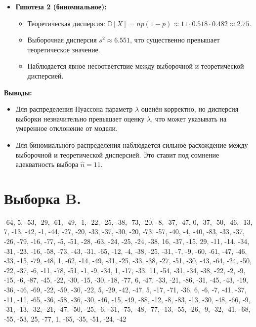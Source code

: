 \documentclass[12pt]{article}
\begin{document}
\begin{enumerate}
\begin{itemize}
        \item \textbf{Гипотеза 2 (биномиальное):}  
            \begin{itemize}  
                \item Теоретическая дисперсия: \( \mathbb{D}[X] = np(1-p) \approx 11 \cdot 0.518 \cdot 0.482 \approx 2.75 \).  
                \item Выборочная дисперсия \( s^2 \approx 6.551 \), что существенно превышает теоретическое значение.  
                \item Наблюдается явное несоответствие между выборочной и теоретической дисперсией.  
            \end{itemize}  
    \end{itemize}  
\end{enumerate}

\textbf{Выводы:}
\begin{itemize}
\item Для распределения Пуассона параметр $\lambda$ оценён корректно, но дисперсия выборки незначительно превышает оценку $\lambda$, что может указывать на умеренное отклонение от модели.
\item Для биномиального распределения наблюдается сильное расхождение между выборочной и теоретической дисперсией. Это ставит под сомнение адекватность выбора $\hat{n} = 11$.
\end{itemize}

\newpage

\section*{Выборка B.}
-64, 5, -53, -29, -61, -49, -1, -22, -25, -38, -73, -20, -8, -37, -47,
    0, -37, -50, -46, -13, 7, -13, -42, -1, -44, -27, -20, -33, -37, -30,
    -20, -73, -57, -40, -4, -40, -83, -33, -37, -26, -79, -16, -77, -5, -51,
    -28, -63, -24, -25, -24, -38, 16, -37, -15, 29, -11, -14, -34, -31, -23,
    -16, -58, -73, -43, -31, -65, -12, -4, -38, -25, -31, -7, -9, -60, -61,
    -47, -46, -33, -15, -79, -48, 1, -62, -14, -49, -31, -25, -33, -38, -27,
    -51, -30, -43, -64, -24, -50, -22, -37, -6, -11, -78, -51, -1, -9, -34,
    1, -17, -33, 11, -54, -31, -34, -38, -22, -2, -9, -15, -6, -87, -45,
    -22, -30, -15, -30, -18, -77, 6, -47, -33, -21, -86, -31, -45, -43, -19,
    -36, -46, -69, -22, -59, -30, -22, 5, -29, -42, -47, 5, -17, -71, -36,
    6, -6, -7, -41, -37, -11, -11, -65, -36, -58, -36, -30, -46, -15, -49,
    -88, -12, -8, -83, -13, -30, -48, -66, -9, -31, -13, -32, -21, -47, -50,
    -25, -6, -31, -75, -48, -77, -13, -55, -26, -9, -32, -41, -68, -55, -53,
    25, -77, 1, -65, -35, -51, -24, -42
\end{document}
